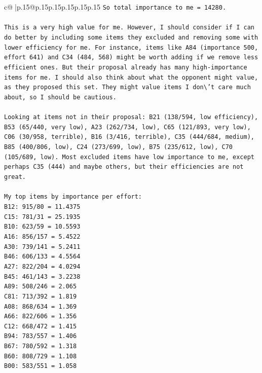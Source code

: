 \documentclass{article}
\begin{document}
{\begin{supertabular}{c@{$\;$}|p{.15\linewidth}@{}p{.15\linewidth}p{.15\linewidth}p{.15\linewidth}p{.15\linewidth}p{.15\linewidth}}
{{{\texttt{So total importance to me = 14280.} \\
\\ 
\texttt{This is a very high value for me. However, I should consider if I can do better by including some items they excluded and removing some with lower efficiency for me. For instance, items like A84 (importance 500, effort 641) and C34 (484, 568) might be worth adding if we remove less efficient ones. But their proposal already has many high{-}importance items for me. I should also think about what the opponent might value, as they proposed this set. They might value items I don\textbackslash{}'t care much about, so I should be cautious.} \\
\\ 
\texttt{Looking at items not in their proposal: B21 (138/594, low efficiency), B53 (65/440, very low), A23 (262/734, low), C65 (121/893, very low), C06 (30/958, terrible), B16 (3/416, terrible), C35 (444/684, medium), B85 (400/806, low), C24 (273/699, low), B75 (235/612, low), C70 (105/689, low). Most excluded items have low importance to me, except perhaps C35 (444) and maybe others, but their efficiencies are not great.} \\
\\ 
\texttt{My top items by importance per effort: } \\
\texttt{B12: 915/80 = 11.4375} \\
\texttt{C15: 781/31 = 25.1935} \\
\texttt{B10: 623/59 = 10.5593} \\
\texttt{A16: 856/157 = 5.4522} \\
\texttt{A30: 739/141 = 5.2411} \\
\texttt{B46: 606/133 = 4.5564} \\
\texttt{A27: 822/204 = 4.0294} \\
\texttt{B45: 461/143 = 3.2238} \\
\texttt{A89: 508/246 = 2.065} \\
\texttt{C81: 713/392 = 1.819} \\
\texttt{A08: 868/634 = 1.369} \\
\texttt{A66: 822/606 = 1.356} \\
\texttt{C12: 668/472 = 1.415} \\
\texttt{B94: 783/557 = 1.406} \\
\texttt{B67: 780/592 = 1.318} \\
\texttt{B60: 808/729 = 1.108} \\
\texttt{B00: 583/551 = 1.058} \\
}}}
\end{supertabular}}
\end{document}
